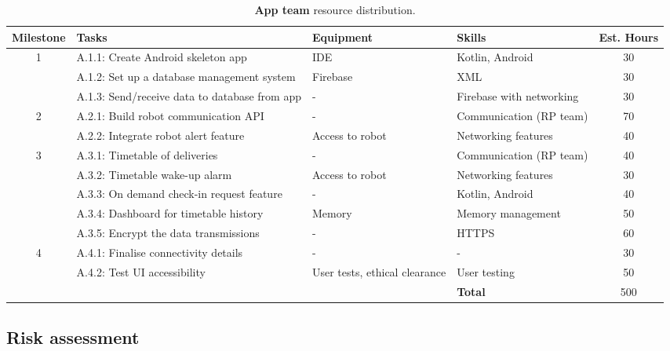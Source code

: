\documentclass{article}
\begin{document}
\begin{table*}[]
  \begin{center}
  \begin{small}
  \begin{tabular}{|c|l|l|l|c|}
    \hline
    {\bf Milestone} & {\bf Tasks} & {\bf Equipment} & {\bf Skills} & {\bf Est. Hours} \\ \hline
    1               & A.1.1: Create Android skeleton app & IDE & Kotlin, Android & 30\\ \cline{2-5}
                    & A.1.2: Set up a database management system & Firebase & XML & 30\\ \cline{2-5}
                    & A.1.3: Send/receive data to database from app & - & Firebase with networking & 30\\ \hline
    2               & A.2.1: Build robot communication API & - & Communication (RP team) & 70\\ \cline{2-5}
                    & A.2.2: Integrate robot alert feature & Access to robot & Networking features & 40\\ \hline
    3               & A.3.1: Timetable of deliveries & - & Communication (RP team) & 40\\ \cline{2-5}
                    & A.3.2: Timetable wake-up alarm & Access to robot & Networking features & 30\\ \cline{2-5}
                    & A.3.3: On demand check-in request feature & - & Kotlin, Android & 40\\ \cline{2-5}
                    & A.3.4: Dashboard for timetable history & Memory & Memory management & 50\\ \cline{2-5}
                    & A.3.5: Encrypt the data transmissions & - & HTTPS & 60\\ \hline
    4               & A.4.1: Finalise connectivity details & - & - & 30\\ \cline{2-5}
                    & A.4.2: Test UI accessibility & User tests, ethical clearance & User testing & 50\\ \hline
                    &                           &  & {\bf Total} & 500 \\ \hline
  \end{tabular}
  \end{small}
  \caption{{\bf App team} resource distribution.}
  \label{tab:app-rd}
  \end{center}
\end{table*}


\subsection{Risk assessment} 
\end{document}
